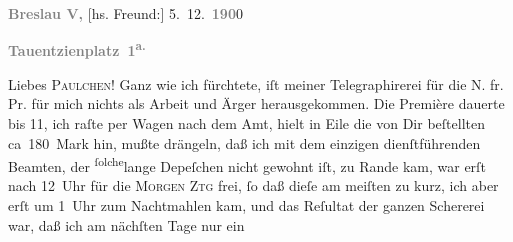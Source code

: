 \pstart
           \raggedleft{}\textcolor{gray}{\textbf{Breslau V,}}{ }{[}hs. Freund:{]} 5. 12. \textcolor{gray}{\textbf{190}}0\pend
           
\pstart
           \raggedleft{}\textcolor{gray}{\textbf{Tauentzienplatz 1\textsuperscript{a.}}}\pend
           
\pstart{}Liebes \textsc{Paulchen}!\pend\vspace{0.5em}
\pstart
           Ganz wie ich fürchtete, iſt meiner Telegraphirerei\pwindex{Man telegraphirt uns aus Breslau…]@\emph{[Man telegraphirt uns aus Breslau…]}|pwv} für die N. fr. Pr. für
               mich nichts als Arbeit und Ärger herausgekommen. Die Première dauerte bis 11, ich
               raſte per Wagen nach dem Amt, hielt in Eile die von Dir beſtellten ca 180 Mark hin,
               mußte drängeln, daß ich mit dem einzigen dienſtführenden Beamten, der \substVorne{}\textsuperscript{ſolche}\substDazwischen{}lange\substHinten{} Depeſchen nicht gewohnt iſt, zu Rande kam, war erſt nach 12 Uhr
               für die \textsc{Morgen Ztg} frei,{ }ſo daß dieſe am meiſten {\pb}zu kurz, ich
               aber erſt um 1 Uhr zum Nachtmahlen kam, und das Reſultat der ganzen
               Schererei war, daß ich am nächſten Tage nur ein
